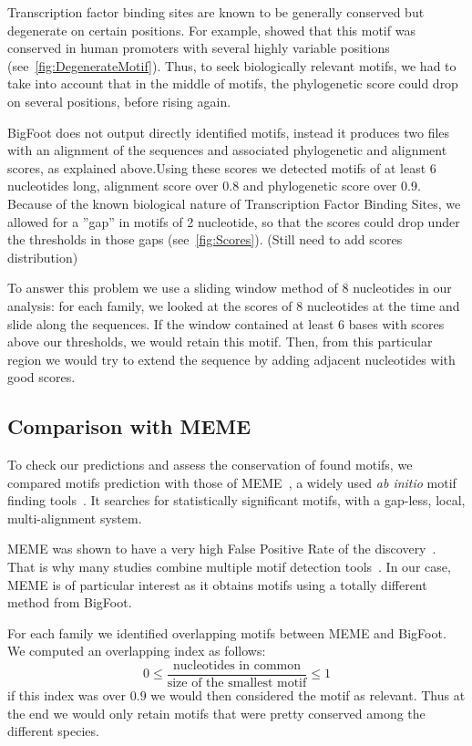 Transcription factor binding sites are known to be generally conserved but degenerate on certain positions. For example, \citealt{whitfield_functional_2012} showed that this motif was conserved in human promoters with several highly variable positions (see~\autoref{fig:DegenerateMotif}). Thus, to seek biologically relevant motifs, we had to take into account that in the middle of motifs, the phylogenetic score could drop on several positions, before rising again.

BigFoot does not output directly identified motifs, instead it produces two files with an alignment of the sequences and associated phylogenetic and alignment scores, as explained above.Using these scores we detected motifs of at least 6 nucleotides long, alignment score over 0.8 and phylogenetic score over 0.9. Because of the known biological nature of Transcription Factor Binding Sites, we allowed for a ''gap'' in motifs of 2 nucleotide, so that the scores could drop under the thresholds in those gaps (see~\autoref{fig:Scores}). (Still need to add scores distribution)

To answer this problem we use a sliding window method of 8 nucleotides in our analysis: for each family, we looked at the scores of 8 nucleotides at the time and slide along the sequences. If the window contained at least 6 bases with scores above our thresholds, we would retain this motif. Then, from this particular region we would try to extend the sequence by adding adjacent nucleotides with good scores.

\subsection*{Comparison with MEME}

To check our predictions and assess the conservation of found motifs, we compared motifs prediction with those of MEME~\citep{bailey_meme:_2006}, a widely used \textit{ab initio} motif finding tools~\citep{dhaeseleer_how_2006}. It searches for statistically significant motifs, with a gap-less, local, multi-alignment system.

MEME was shown to have a very high False Positive Rate of the discovery~\citep{zia_towards_2012}. That is why many studies combine multiple motif detection tools~\citep{liseron-monfils_promzea:_2013}. In our case, MEME is of particular interest as it obtains motifs using a totally different method from BigFoot.

For each family we identified overlapping motifs between MEME and BigFoot. We computed an overlapping index as follows: 
\begin{equation}
0 \leq \frac{\text{nucleotides in common}}{\text{size of the smallest motif}} \leq 1
\end{equation}
if this index was over $0.9$ we would then considered the motif as relevant. Thus at the end we would only retain motifs that were pretty conserved among the different species.

